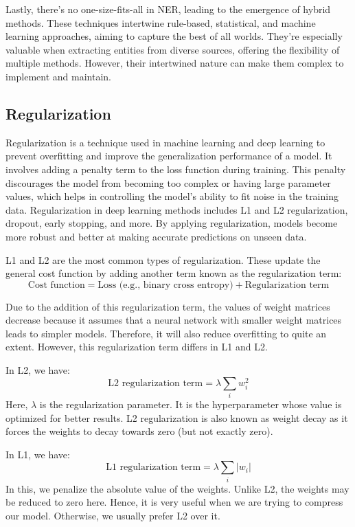Lastly, there's no one-size-fits-all in NER, leading to the emergence of hybrid methods. These techniques intertwine rule-based, statistical, and machine learning approaches, aiming to capture the best of all worlds. They're especially valuable when extracting entities from diverse sources, offering the flexibility of multiple methods. However, their intertwined nature can make them complex to implement and maintain.


\subsection{Regularization}
Regularization\cite{AnalyticsVidhya2018Regularization} is a technique used in machine learning and deep learning to prevent overfitting and improve the generalization performance of a model. It involves adding a penalty term to the loss function during training. This penalty discourages the model from becoming too complex or having large parameter values, which helps in controlling the model’s ability to fit noise in the training data. Regularization in deep learning methods includes L1 and L2 regularization, dropout, early stopping, and more. By applying regularization, models become more robust and better at making accurate predictions on unseen data.

L1 and L2 are the most common types of regularization. These update the general cost function by adding another term known as the regularization term:
\begin{equation}
    \text{Cost function} = \text{Loss (e.g., binary cross entropy)} + \text{Regularization term}
\end{equation}

Due to the addition of this regularization term, the values of weight matrices decrease because it assumes that a neural network with smaller weight matrices leads to simpler models. Therefore, it will also reduce overfitting to quite an extent. However, this regularization term differs in L1 and L2.

In L2, we have:
\begin{equation}
    \text{L2 regularization term} = \lambda \sum_{i} w_i^2
\end{equation}
Here, $\lambda$ is the regularization parameter. It is the hyperparameter whose value is optimized for better results. L2 regularization is also known as weight decay as it forces the weights to decay towards zero (but not exactly zero).

In L1, we have:
\begin{equation}
    \text{L1 regularization term} = \lambda \sum_{i} |w_i|
\end{equation}
In this, we penalize the absolute value of the weights. Unlike L2, the weights may be reduced to zero here. Hence, it is very useful when we are trying to compress our model. Otherwise, we usually prefer L2 over it.

